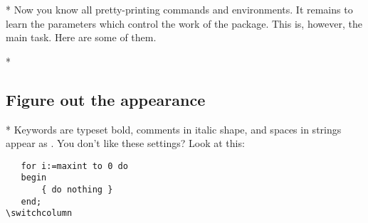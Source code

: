 \begin{paracol}{2}
\switchcolumn[0]*%
Now you know all pretty-printing commands and environments. It remains
to learn the parameters which control the work of the 
package. This is, however, the main task. Here are some of them.
\switchcolumn

\switchcolumn[0]*%
\subsection{Figure out the appearance}\label{gFigureOutTheAppearance}
\switchcolumn

\switchcolumn[0]*%
Keywords are typeset bold, comments in italic shape, and spaces in strings
appear as \textvisiblespace. You don't like these settings? Look at this:
\ifcolor
\begin{lstxsample}
\end{lstxsample}
\else
\begin{lstxsample}
   \lstset{%
       basicstyle=\small,          %
       keywordstyle=\bfseries\underbar,
       identifierstyle=,           %
       commentstyle=\itshape,      %
       stringstyle=\ttfamily,      %
       showstringspaces=false}     %
\end{lstxsample}
\fi
\begin{lstsample}{}{}
   \begin{lstlisting}
   for i:=maxint to 0 do
   begin
       { do nothing }
   end;
\switchcolumn


\end{lstlisting}
\end{lstsample}
\end{paracol}
